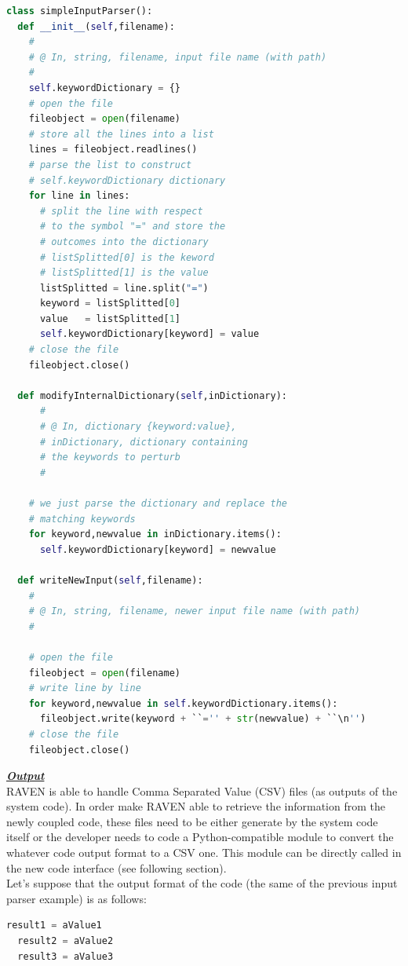 \begin{lstlisting}[language=python]
class simpleInputParser():
  def __init__(self,filename):
    # 
    # @ In, string, filename, input file name (with path)
    #
    self.keywordDictionary = {}
    # open the file
    fileobject = open(filename)
    # store all the lines into a list
    lines = fileobject.readlines()
    # parse the list to construct 
    # self.keywordDictionary dictionary
    for line in lines:
      # split the line with respect
      # to the symbol "=" and store the
      # outcomes into the dictionary
      # listSplitted[0] is the keword
      # listSplitted[1] is the value
      listSplitted = line.split("=")
      keyword = listSplitted[0]
      value   = listSplitted[1]
      self.keywordDictionary[keyword] = value
    # close the file
    fileobject.close()
   
  def modifyInternalDictionary(self,inDictionary):
      # 
      # @ In, dictionary {keyword:value}, 
      # inDictionary, dictionary containing
      # the keywords to perturb 
      #

    # we just parse the dictionary and replace the
    # matching keywords
    for keyword,newvalue in inDictionary.items():
      self.keywordDictionary[keyword] = newvalue

  def writeNewInput(self,filename):
    #
    # @ In, string, filename, newer input file name (with path)
    #

    # open the file
    fileobject = open(filename)
    # write line by line
    for keyword,newvalue in self.keywordDictionary.items():
      fileobject.write(keyword + ``='' + str(newvalue) + ``\n'')
    # close the file
    fileobject.close()
\end{lstlisting} 
\textbf{\textit{\underline{Output}}}
\newline
\\RAVEN is able to handle Comma Separated Value (CSV) files (as outputs 
of the system code). In order make RAVEN able to retrieve the information
 from the newly coupled code, these files need to be  either generate by the 
 system code itself or the developer needs to code a Python-compatible 
module to convert the whatever code output format to a CSV one. 
This module can be  directly called in the new code interface (see following section).
\\ Let's suppose that the output format of the code (the same of the previous 
input parser example) is as follows:
\begin{lstlisting}[language=python]
  result1 = aValue1
  result2 = aValue2
  result3 = aValue3
\end{lstlisting} 
